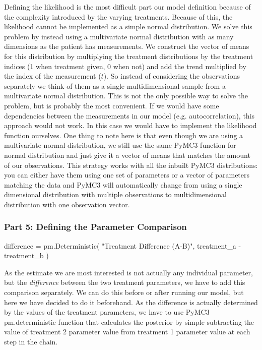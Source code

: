 \documentclass[12pt,a4paper,leqno]{report}
\theoremstyle{plain}
\theoremstyle{definition}
\theoremstyle{remark}
\begin{document}
Defining the likelihood is the most difficult part our model definition because of the
complexity introduced by the varying treatments. Because of this, the likelihood cannot
be implemented as a simple normal distribution. We solve this problem by instead using a
multivariate normal distribution with as many dimensions as the patient has
measurements. We construct the vector of means for this distribution by multiplying the
treatment distributions by the treatment indices (1 when
treatment given, 0 when not) and add the trend multiplied by the index of the
measurement (\(t\)). So instead of considering
the observations separately we think of them as a single multidimensional sample from
a multivariate normal distribution. This is not the only possible way to solve the
problem, but is probably the most convenient. If we would have some
dependencies between the measurements in our model (e.g. autocorrelation), this approach
would not work. In this case we would have to implement the likelihood function
ourselves. One thing to note here is that even though we are using a multivariate normal
distribution, we still use the same PyMC3 function for normal distribution and just give
it a vector of means that matches the amount of our observations. This strategy works
with all the inbuilt PyMC3 distributions: you can either have them using one set of
parameters or a vector of parameters matching the data and PyMC3 will automatically
change from using a single dimensional distribution with multiple observations to
multidimensional distribution with one observation vector.

\subsubsection*{Part 5: Defining the Parameter Comparison}

\bigskip
\begin{pyverbatim}[][fontsize=\footnotesize]
    difference = pm.Deterministic(
        "Treatment Difference (A-B)", treatment_a - treatment_b
    )
\end{pyverbatim}
\bigskip

As the estimate we are most interested is not actually any individual parameter, but the
\emph{difference} between the two treatment parameters, we have to add this comparison separately.
We can do this before or after running our model, but here we have decided to do it
beforehand. As the difference is actually determined by the values of the treatment
parameters, we have to use PyMC3 pm.deterministic function that calculates the posterior
by simple subtracting the value of treatment 2 parameter value from treatment 1
parameter value at each step in the chain.
\end{document}

